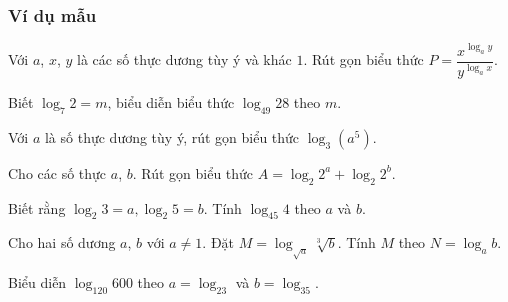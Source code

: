 \subsubsection{Ví dụ mẫu}
\begin{vd}
	Với $a$, $x$, $y$ là các số thực dương tùy ý và khác $1$. Rút gọn biểu thức $P=\dfrac{x^{\log _{a} y}}{y^{\log _{a} x}}$.
\end{vd}
\begin{vd} 
	Biết $\log _{7} 2=m$, biểu diễn biểu thức $\log _{49} 28$ theo $m$.	
\end{vd}
\begin{vd}
	Với $ a $ là số thực dương tùy ý, rút gọn biểu thức $\log_{3}\left(a^5\right)$.
\end{vd}
\begin{vd} 
	Cho các số thực $ a $, $ b $. Rút gọn biểu thức $ A=\log_2 2^a+\log_2 2^b $.	
\end{vd}
\begin{vd}
	Biết rằng $\log _2 3=a, \log _2 5=b$. Tính $\log _{45} 4$ theo $a$ và $b$.
\end{vd}
\begin{vd}
	Cho hai số dương $a$, $b$ với $a\ne 1$. Đặt $M=\log_{\sqrt{a}}\sqrt[3]{b}$. Tính $M$ theo $N=\log_ab$.
\end{vd}
\begin{vd}
	Biểu diễn $\log_{120}600$ theo $a=\log_23$ và $b=\log_35$.
\end{vd}

